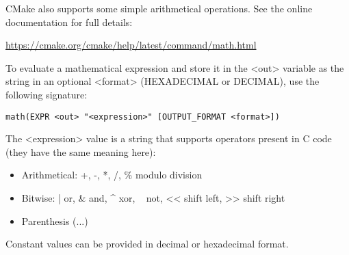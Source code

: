 CMake also supports some simple arithmetical operations. See the online documentation for full details:

\url{https://cmake.org/cmake/help/latest/command/math.html}

To evaluate a mathematical expression and store it in the <out> variable as the string in an optional <format> (HEXADECIMAL or DECIMAL), use the following signature:

\begin{lstlisting}[style=styleCMake]
math(EXPR <out> "<expression>" [OUTPUT_FORMAT <format>])
\end{lstlisting}

The <expression> value is a string that supports operators present in C code (they have the same meaning here):

\begin{itemize}
\item 
Arithmetical: +, -, *, /, \% modulo division

\item 
Bitwise: | or, \& and, \^{} xor, ~ not, <{}< shift left, >{}> shift right

\item 
Parenthesis (...)
\end{itemize}

Constant values can be provided in decimal or hexadecimal format.













